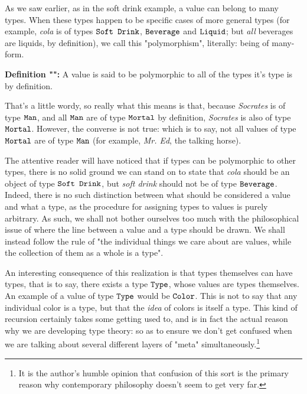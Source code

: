 \documentclass[12pt]{book}
\renewcommand{\value}[1]{\textit{#1}}
\newcommand{\type}[1]{\ensuremath{\text{\texttt{#1}}}}
\newcommand{\what}{}
\newcommand{\defn}[2]{\renewcommand{\what}{#1}\textbf{Definition "\titlecap{#1}":} #2}
\begin{document}
As we saw earlier, as in the soft drink example, a value can belong to many types. When these types happen to be
specific cases of more general types (for example, \value{cola} is of types \type{Soft Drink}, \type{Beverage} and
\type{Liquid}; but \textit{all} beverages are liquids, by definition), we call this "polymorphism", literally:
being of many-form.

\defn{polymorphism}{A value is said to be polymorphic to all of the types it's type is by definition.}

That's a little wordy, so really what this means is that, because \value{Socrates} is of type \type{Man}, and all
\type{Man} are of type \type{Mortal} by definition, \value{Socrates} is also of type \type{Mortal}. However, the
converse is not true: which is to say, not all values of type \type{Mortal} are of type \type{Man} (for example,
\value{Mr. Ed}, the talking horse).

The attentive reader will have noticed that if types can be polymorphic to other types, there is no solid ground we can
stand on to state that \value{cola} should be an object of type \type{Soft Drink}, but \value{soft drink} should not
be of type \type{Beverage}. Indeed, there is no such distinction between what should be considered a value and what a
type, as the procedure for assigning types to values is purely arbitrary. As
such, we shall not bother ourselves too much with the philosophical issue of where the line between a value and a type
should be drawn. We shall instead follow the rule of "the individual things we care about are values, while the
collection of them as a whole is a type".

An interesting consequence of this realization is that types themselves can have types, that is to say, there exists a
type \type{Type}, whose values are types themselves. An example of a value of type \type{Type} would be
\type{Color}. This is not to say that any individual color is a type, but that the \textit{idea} of colors is itself a
type. This kind of recursion certainly takes some getting used to, and is in fact the actual reason why we are
developing type theory: so as to ensure we don't get confused when we are talking about several different layers of
"meta" simultaneously.\footnote{It is the author's humble opinion that confusion of this sort is the primary reason why
contemporary philosophy doesn't seem to get very far.}
\end{document}

